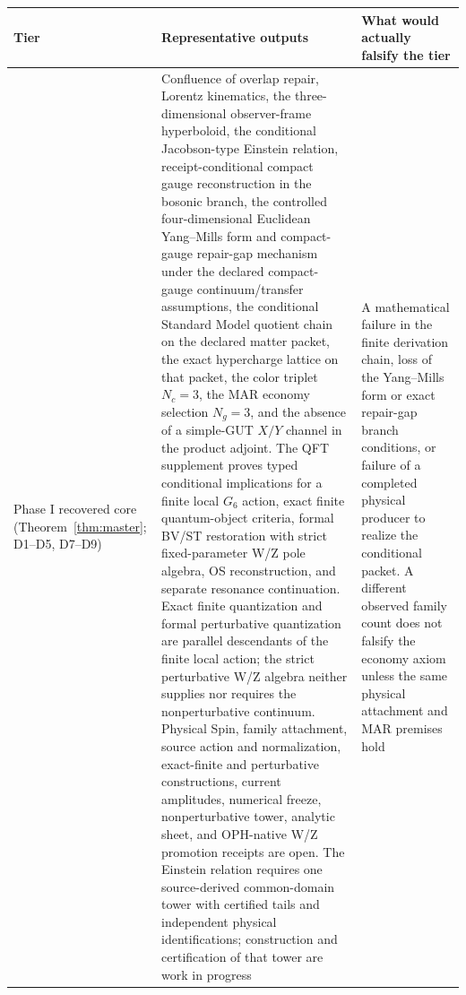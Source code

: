 \documentclass[11pt]{article}
\begin{document}
\begingroup
\footnotesize
\begin{longtable}{@{}>{\raggedright\arraybackslash}p{}>{\raggedright\arraybackslash}p{}>{\raggedright\arraybackslash}p{}@{}}
\toprule
Tier & Representative outputs & What would actually falsify the tier \\
\midrule
\endhead
\bottomrule
\endfoot
Phase I recovered core (Theorem~\ref{thm:master}; D1--D5, D7--D9) & Confluence of overlap repair, Lorentz kinematics, the three-dimensional observer-frame hyperboloid, the conditional Jacobson-type Einstein relation, receipt-conditional compact gauge reconstruction in the bosonic branch, the controlled four-dimensional Euclidean Yang--Mills form and compact-gauge repair-gap mechanism under the declared compact-gauge continuum/transfer assumptions, the conditional Standard Model quotient chain on the declared matter packet, the exact hypercharge lattice on that packet, the color triplet \(N_c=3\), the MAR economy selection \(N_g=3\), and the absence of a simple-GUT \(X/Y\) channel in the product adjoint. The QFT supplement proves typed conditional implications for a finite local \(G_6\) action, exact finite quantum-object criteria, formal BV/ST restoration with strict fixed-parameter W/Z pole algebra, OS reconstruction, and separate resonance continuation. Exact finite quantization and formal perturbative quantization are parallel descendants of the finite local action; the strict perturbative W/Z algebra neither supplies nor requires the nonperturbative continuum. Physical Spin, family attachment, source action and normalization, exact-finite and perturbative constructions, current amplitudes, numerical freeze, nonperturbative tower, analytic sheet, and OPH-native W/Z promotion receipts are open. The Einstein relation requires one source-derived common-domain tower with certified tails and independent physical identifications; construction and certification of that tower are work in progress & A mathematical failure in the finite derivation chain, loss of the Yang--Mills form or exact repair-gap branch conditions, or failure of a completed physical producer to realize the conditional packet. A different observed family count does not falsify the economy axiom unless the same physical attachment and MAR premises hold \\

\end{longtable}
\end{document}
